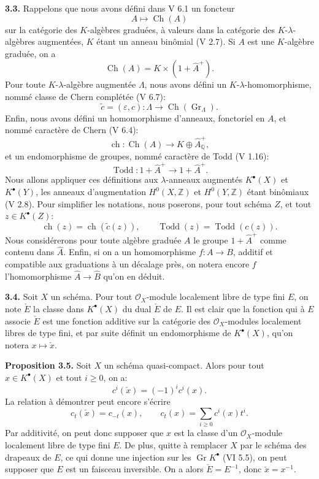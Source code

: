 \documentclass[11pt]{article}
\newcommand{\Gr}{\operatorname{Gr}}
\newcommand{\ch}{\operatorname{ch}}
\newcommand{\Todd}{\operatorname{Todd}}
\providecommand{\ch}{\operatorname{ch}}
\providecommand{\Todd}{\operatorname{Todd}}
\providecommand{\Gr}{\operatorname{Gr}}
\providecommand{\Gr}{\operatorname{G}}
\begin{document}
\textbf{3.3.} Rappelons que nous avons défini dans V 6.1 un foncteur
\[
A\longmapsto \operatorname{Ch}(A)
\]
sur la catégorie des $K$-algèbres graduées, à valeurs dans la catégorie des $K$-$\lambda$-algèbres augmentées, $K$ étant un anneau binômial (V 2.7). Si $A$ est une $K$-algèbre graduée, on a
\[
\operatorname{Ch}(A)=K\times(1+\widehat A^+).
\]
Pour toute $K$-$\lambda$-algèbre augmentée $\Lambda$, nous avons défini un $K$-$\lambda$-homomorphisme, nommé classe de Chern complétée (V 6.7):
\[
\widetilde c=(\varepsilon,c):\Lambda\longrightarrow\operatorname{Ch}(\Gr_{\Lambda}).
\]
Enfin, nous avons défini un homomorphisme d'anneaux, fonctoriel en $A$, et nommé caractère de Chern (V 6.4):
\[
\ch:\operatorname{Ch}(A)\longrightarrow K\oplus\widehat A^+_{\mathbb Q},
\]
et un endomorphisme de groupes, nommé caractère de Todd (V 1.16):
\[
\Todd:1+\widehat A^+\longrightarrow1+\widehat A^+.
\]
Nous allons appliquer ces définitions aux $\lambda$-anneaux augmentés $K^{\bullet}(X)$ et $K^{\bullet}(Y)$, les anneaux d'augmentation $H^0(X,\mathbb Z)$ et $H^0(Y,\mathbb Z)$ étant binômiaux (V 2.8). Pour simplifier les notations, nous poserons, pour tout schéma $Z$, et tout $z\in K^{\bullet}(Z)$:
\[
\ch(z)=\ch(\widetilde c(z)),
\qquad
\Todd(z)=\Todd(c(z)).
\]
Nous considérerons pour toute algèbre graduée $A$ le groupe $1+\widehat A^+$ comme contenu dans $\widehat A$. Enfin, si on a un homomorphisme $f:A\to B$, additif et compatible aux graduations à un décalage près, on notera encore $f$ l'homomorphisme $\widehat A\to\widehat B$ qu'on en déduit.

\textbf{3.4.} Soit $X$ un schéma. Pour tout $\mathcal O_X$-module localement libre de type fini $E$, on note $\check E$ la classe dans $K^{\bullet}(X)$ du dual $\check E$ de $E$. Il est clair que la fonction qui à $E$ associe $\check E$ est une fonction additive sur la catégorie des $\mathcal O_X$-modules localement libres de type fini, et par suite définit un endomorphisme de $K^{\bullet}(X)$, qu'on notera $x\mapsto\check x$.

\textbf{Proposition 3.5.} Soit $X$ un schéma quasi-compact. Alors pour tout $x\in K^{\bullet}(X)$ et tout $i\geq0$, on a:
\[
c^i(\check x)=(-1)^i c^i(x).
\]
La relation à démontrer peut encore s'écrire
\[
c_t(\check x)=c_{-t}(x),
\qquad
c_t(x)=\sum_{i\geq0}c^i(x)t^i.
\]
Par additivité, on peut donc supposer que $x$ est la classe d'un $\mathcal O_X$-module localement libre de type fini $E$. De plus, quitte à remplacer $X$ par le schéma des drapeaux de $E$, ce qui donne une injection sur les $\Gr K^{\bullet}$ (VI 5.5), on peut supposer que $E$ est un faisceau inversible. On a alors $\check E=E^{-1}$, donc $\check x=x^{-1}$.
\end{document}
